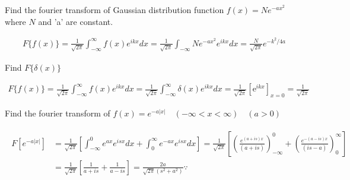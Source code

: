 \begin{exercise}
	Find the fourier transform of Gaussian distribution function $f(x)=N e^{-a x^{2}}$ where $N$ and 'a' are constant.
\end{exercise}
\begin{answer}
	\begin{align*}
	F\{f(x)\}=\frac{1}{\sqrt{2 \pi}} \int_{-\infty}^{\infty} f(x) e^{i k x} d x=\frac{1}{\sqrt{2 \pi}} \int_{-\infty} N e^{-a x^{2}} e^{i k x} d x=\frac{N}{\sqrt{2 \pi}} e^{-k^{2} / 4 a}
	\end{align*}
\end{answer}
\begin{exercise}
	Find $F\{\delta(x)\}$
\end{exercise}
\begin{answer}
	\begin{align*}
	F\{f(x)\}=\frac{1}{\sqrt{2 \pi}} \int_{-\infty}^{\infty} f(x) e^{i k x} d x=\frac{1}{\sqrt{2 \pi}} \int_{-\infty}^{\infty} \delta(x) e^{i k x} d x=\frac{1}{\sqrt{2 \pi}}\left[\mathrm{e}^{i k x}\right]_{x=0}=\frac{1}{\sqrt{2 \pi}}
	\end{align*}
\end{answer}
\begin{exercise}
	Find the fourier transform of $f(x)=e^{-a|x|} \quad(-\infty<x<\infty) \quad(a>0)$
\end{exercise}
\begin{answer}
	\begin{align*}
	\begin{aligned}
	F\left[e^{-a|x|}\right] &=\frac{1}{\sqrt{2 \pi}}\left[\int_{-\infty}^{0} e^{a x} e^{i s x} d x+\int_{0}^{\infty} e^{-a x} e^{i s x} d x\right]=\frac{1}{\sqrt{2 \pi}}\left[\left(\frac{e^{(a+i s) x}}{(a+i s)}\right)_{-\infty}^{0}+\left(\frac{e^{-(a-i s) x}}{(i s-a)}\right)_{0}^{\infty}\right] \\
	&=\frac{1}{\sqrt{2 \pi}}\left[\frac{1}{a+i s}+\frac{1}{a-i s}\right]=\frac{2 a}{\sqrt{2 \pi}\left(s^{2}+a^{2}\right)} \because
	\end{aligned}
	\end{align*}
\end{answer}

